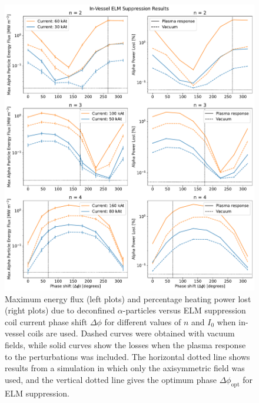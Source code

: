 \documentclass[10pt, a4paper, twoside]{article}
\begin{document}
\begin{figure}[htpb]
    \centering
    \vspace{-1cm}
    \includegraphics[width=0.99\linewidth]{Figures/max_and_total_flux_vs_phase_interior_rmp.pdf}
    \caption{Maximum energy flux (left plots) and percentage heating power lost (right plots) due to deconfined $\alpha$-particles versus ELM suppression coil current phase shift $\Delta\phi$ for different values of $n$ and $I_0$ when in-vessel coils are used. Dashed curves were obtained with vacuum fields, while solid curves show the losses when the plasma response to the perturbations was included. The horizontal dotted line shows results from a simulation in which only the axisymmetric field was used, and the vertical dotted line gives the optimum phase $\Delta\phi_\text{opt}$ for ELM suppression.}
    \vspace{-2cm}
    \label{fig:max_and_total_flux_vs_phase_elm_rwm}
\end{figure}
\end{document}
